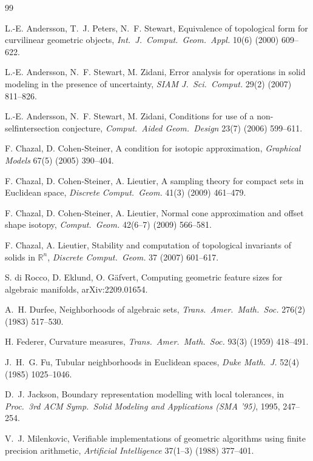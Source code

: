 \begin{thebibliography}{99}

 L.-E. Andersson, T.~J. Peters, N.~F. Stewart, Equivalence of topological form for curvilinear
geometric objects, \emph{Int.\ J.\ Comput.\ Geom.\ Appl.} 10(6) (2000) 609--622.

 L.-E. Andersson, N.~F. Stewart, M. Zidani, Error analysis for operations in solid modeling in the
presence of uncertainty, \emph{SIAM J.\ Sci.\ Comput.} 29(2) (2007) 811--826.

 L.-E. Andersson, N.~F. Stewart, M. Zidani, Conditions for use of a non-selfintersection conjecture,
\emph{Comput.\ Aided Geom.\ Design} 23(7) (2006) 599--611.

 F. Chazal, D. Cohen-Steiner, A condition for isotopic approximation, \emph{Graphical Models} 67(5)
(2005) 390--404.

 F. Chazal, D. Cohen-Steiner, A. Lieutier, A sampling theory for compact sets in Euclidean space,
\emph{Discrete Comput.\ Geom.} 41(3) (2009) 461--479.

 F. Chazal, D. Cohen-Steiner, A. Lieutier, Normal cone approximation and offset shape isotopy,
\emph{Comput.\ Geom.} 42(6--7) (2009) 566--581.

 F. Chazal, A. Lieutier, Stability and computation of topological invariants of solids
in $\mathbb R^n$, \emph{Discrete Comput.\ Geom.} 37 (2007) 601--617.

 S. di Rocco, D. Eklund, O. Gäfvert, Computing geometric feature sizes for algebraic manifolds,
arXiv:2209.01654.

 A.~H. Durfee, Neighborhoods of algebraic sets, \emph{Trans.\ Amer.\ Math.\ Soc.} 276(2) (1983) 517--530.

 H. Federer, Curvature measures, \emph{Trans.\ Amer.\ Math.\ Soc.} 93(3) (1959) 418--491.

 J.~H.~G. Fu, Tubular neighborhoods in Euclidean spaces, \emph{Duke Math.\ J.} 52(4) (1985) 1025--1046.

 D.~J. Jackson, Boundary representation modelling with local tolerances, in \emph{Proc.\ 3rd ACM
Symp.\ Solid Modeling and Applications (SMA '95)}, 1995, 247--254.

 V.~J. Milenkovic, Verifiable implementations of geometric algorithms using finite precision
arithmetic, \emph{Artificial Intelligence} 37(1--3) (1988) 377--401.



\end{thebibliography}
